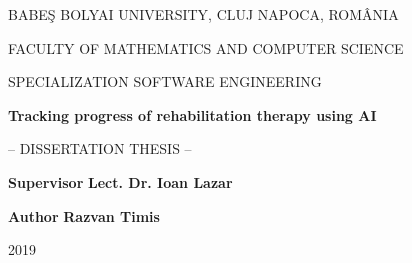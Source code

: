
\begin{titlepage}
\sloppy
\begin{center}
BABE\c S BOLYAI UNIVERSITY, CLUJ NAPOCA, ROM\^ ANIA

FACULTY OF MATHEMATICS AND COMPUTER SCIENCE

SPECIALIZATION SOFTWARE ENGINEERING 

\vspace{5cm}

\Huge \textbf{Tracking progress of rehabilitation therapy using AI}

\vspace{1cm}

\normalsize -- DISSERTATION THESIS --

\end{center}


\vspace{5cm}

\begin{flushleft}
\textbf{Supervisor} \break
\Large{\textbf{Lect. Dr. Ioan Lazar}}
\end{flushleft}

\begin{flushright}
\textbf{Author} \break
\Large{\textbf{Razvan Timis}}
\end{flushright}

\vspace{4cm}

\begin{center}
2019
\end{center}

\end{titlepage}